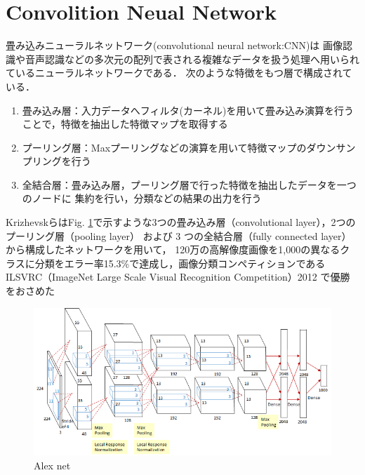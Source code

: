 \newpage
\section{Convolition Neual Network}
畳み込みニューラルネットワーク(convolutional neural network:CNN)は
画像認識や音声認識などの多次元の配列で表される複雑なデータを扱う処理へ用いられているニューラルネットワークである．
次のような特徴をもつ層で構成されている．

\begin{enumerate}
    \item 畳み込み層：入力データへフィルタ(カーネル)を用いて畳み込み演算を行うことで，特徴を抽出した特徴マップを取得する
    \item プーリング層：Maxプーリングなどの演算を用いて特徴マップのダウンサンプリングを行う
    \item 全結合層：畳み込み層，プーリング層で行った特徴を抽出したデータを一つのノードに
                      集約を行い，分類などの結果の出力を行う
\end{enumerate}


Krizhevskら\cite{Imagenet}はFig. \ref{fig::alex}で示すような3つの畳み込み層（convolutional layer），2つのプーリング層（pooling layer）
および 3 つの全結合層（fully connected layer）から構成したネットワークを用いて，
120万の高解像度画像を1,000の異なるクラスに分類をエラー率15.3\%で達成し，画像分類コンペティションであるILSVRC（ImageNet Large Scale Visual Recognition Competition）2012
で優勝をおさめた

\vspace{2.0zh}

\begin{figure}[h]
    \centering
    \includegraphics[width = 15cm]{./figs/alex.pdf}
    \caption{Alex net\cite{Imagenet}}
    \label{fig::alex}
\end{figure}

